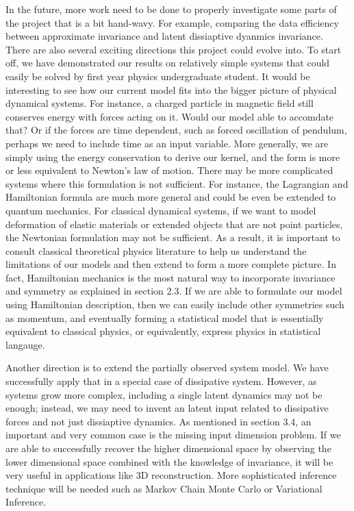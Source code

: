 \documentclass{statsmsc}
\begin{document}
In the future, more work need to be done to properly investigate some parts of the project that is a bit hand-wavy. For example, comparing the data efficiency between approximate invariance and latent dissiaptive dyanmics invariance.
There are also several exciting directions this project could evolve into.
To start off, we have demonstrated our results on relatively simple systems that could easily be solved by first year physics undergraduate student. 
It would be interesting to see how our current model fits into the bigger picture of physical dynamical systems.
For instance, a charged particle in magnetic field still conserves energy with forces acting on it. 
Would our model able to accomdate that?
Or if the forces are time dependent, such as forced oscillation of pendulum, perhaps we need to include time as an input variable.
More generally, we are simply using the energy conservation to derive our kernel, and the form is more or less equivalent to Newton's law of motion.
There may be more complicated systems where this formulation is not sufficient.
For instance, the Lagrangian and Hamiltonian formula are much more general and could be even be extended to quantum mechanics.
For classical dynamical systems, if we want to model deformation of elastic materials or extended objects that are not point particles, the Newtonian formulation may not be sufficient.
As a result, it is important to consult classical theoretical physics literature to help us understand the limitations of our models and then extend to form a more complete picture.  
In fact, Hamiltonian mechanics is the most natural way to incorporate invariance and symmetry as explained in section 2.3.
If we are able to formulate our model using Hamiltonian description, then we can easily include other symmetries such as momentum, and eventually forming a statistical model that is essentially equivalent to classical physics, or equivalently, express physics in statistical langauge.

Another direction is to extend the partially observed system model.
We have successfully apply that in a special case of dissipative system.
However, as systems grow more complex, including a single latent dynamics may not be enough; instead, we may need to invent an latent input related to dissipative forces and not just dissiaptive dynamics.
As mentioned in section 3.4, an important and very common case is the missing input dimension problem.
If we are able to successfully recover the higher dimensional space by observing the lower dimensional space combined with the knowledge of invariance, it will be very useful in applications like 3D reconstruction.
More sophisticated inference technique will be needed such as Markov Chain Monte Carlo or Variational Inference.
\end{document}

